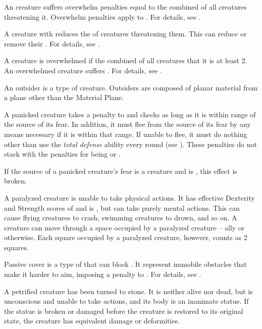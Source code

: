  An  creature suffers overwhelm penalties equal to the combined  of all creatures threatening it.
Overwhelm penalties apply to .
For details, see .

 A creature with  reduces the  of creatures threatening them.
This can reduce or remove their .
For details, see .

 A creature is overwhelmed if the combined  of all creatures that  it is at least 2.
An overwhelmed creature suffers .
For details, see .

 An outsider is a type of creature.
Outsiders are composed of planar material from a plane other than the Material Plane.

 A panicked creature takes a  penalty to  and checks as long as it is within \rngmed range of the source of its fear.
In addition, it must flee from the source of its fear by any means necessary if it is within that range.
If unable to flee, it must do nothing other than use the \textit{total defense} ability every round (see ).
These penalties do not stack with the penalties for being \shaken or \panicked.

If the source of a panicked creature's fear is a creature and is , this effect is broken.

 A paralyzed creature is unable to take physical actions. It has effective Dexterity and Strength scores of  and is \helpless, but can take purely mental actions. This can cause flying creatures to crash, swimming creatures to drown, and so on. A creature can move through a space occupied by a paralyzed creature -- ally or otherwise. Each square occupied by a paralyzed creature, however, counts as 2 squares.

 Passive cover is a type of  that can block .
It represent immobile obstacles that make it harder to aim, imposing a  penalty to .
For details, see .

 A petrified creature has been turned to stone. It is neither alive nor dead, but is unconscious and unable to take actions, and its body is an inanimate statue. If the statue is broken or damaged before the creature is restored to its original state, the creature has equivalent damage or deformities.

